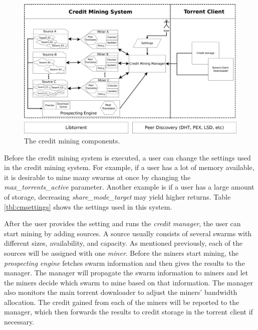 \begin{figure}[ht]
	\centering
 	\includegraphics[width=\textwidth]{pics/cm_components.pdf}
	\caption{The credit mining components.}
	\label{fig:cmcomponents}
\end{figure}

Before the credit mining system is executed, a user can change the settings used in the credit mining system. For example, if a user has a lot of memory available, it is desirable to mine many swarms at once by changing the \textit{max\_torrents\_active} parameter. Another example is if a user has a large amount of storage, decreasing \textit{share\_mode\_target} may yield higher returns. Table \ref{tbl:cmsettings} shows the settings used in this system. 

After the user provides the setting and runs the \textit{credit manager}, the user can start mining by adding sources. A source usually consists of several swarms with different sizes, availability, and capacity. As mentioned previously, each of the sources will be assigned with one \textit{miner}. Before the miners start mining, the \textit{prospecting engine} fetches swarm information and then gives the results to the manager. The manager will propagate the swarm information to miners and let the miners decide which swarm to mine based on that information. The manager also monitors the main torrent downloader to adjust the miners' bandwidth allocation. The credit gained from each of the miners will be reported to the manager, which then forwards the results to credit storage in the torrent client if necessary.

